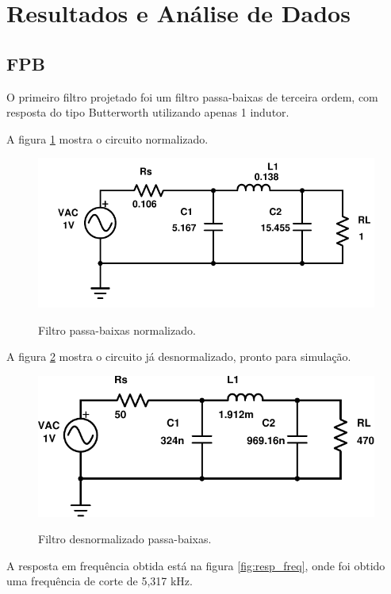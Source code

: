 
\newpage

\section{Resultados e Análise de Dados}

\subsection{FPB}
O primeiro filtro projetado foi um filtro passa-baixas de terceira ordem, com 
resposta do tipo Butterworth utilizando apenas 1 indutor.

A figura \ref{fig:fpb-norm} mostra o circuito normalizado.
\begin{figure}[!h]
  \centering
  
  \includegraphics[scale=0.4]{Imagens/fpb-norm}
  \label{fig:fpb-norm}
  \caption{Filtro passa-baixas normalizado.}
\end{figure}


A figura \ref{fig:fpb} mostra o circuito já desnormalizado, pronto para 
simulação.
\begin{figure}[!h]
  \centering
  
  \includegraphics[scale=0.4]{Imagens/fpb}
  \label{fig:fpb}
  \caption{Filtro desnormalizado passa-baixas.}
\end{figure}

A resposta em frequência obtida está na figura \ref{fig:resp_freq}, onde foi 
obtido uma frequência de corte de 5,317 kHz. 

